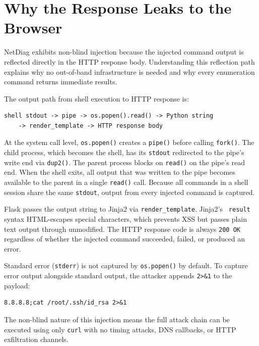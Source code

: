 \vspace{0.3cm}

\section{Why the Response Leaks to the Browser}

NetDiag exhibits non-blind injection because the injected command output is reflected directly in the HTTP response body. Understanding this reflection path explains why no out-of-band infrastructure is needed and why every enumeration command returns immediate results.

The output path from shell execution to HTTP response is:

\begin{lstlisting}
shell stdout -> pipe -> os.popen().read() -> Python string
    -> render_template -> HTTP response body
\end{lstlisting}

At the system call level, \texttt{os.popen()} creates a \texttt{pipe()} before calling \texttt{fork()}. The child process, which becomes the shell, has its \texttt{stdout} redirected to the pipe's write end via \texttt{dup2()}. The parent process blocks on \texttt{read()} on the pipe's read end. When the shell exits, all output that was written to the pipe becomes available to the parent in a single \texttt{read()} call. Because all commands in a shell session share the same \texttt{stdout}, output from every injected command is captured.

Flask passes the output string to Jinja2 via \texttt{render\_template}. Jinja2's \texttt{{{ result }}} syntax HTML-escapes special characters, which prevents XSS but passes plain text output through unmodified. The HTTP response code is always \texttt{200 OK} regardless of whether the injected command succeeded, failed, or produced an error.

Standard error (\texttt{stderr}) is not captured by \texttt{os.popen()} by default. To capture error output alongside standard output, the attacker appends \texttt{2>\&1} to the payload:

\begin{lstlisting}
8.8.8.8;cat /root/.ssh/id_rsa 2>&1
\end{lstlisting}

The non-blind nature of this injection means the full attack chain can be executed using only \texttt{curl} with no timing attacks, DNS callbacks, or HTTP exfiltration channels.

